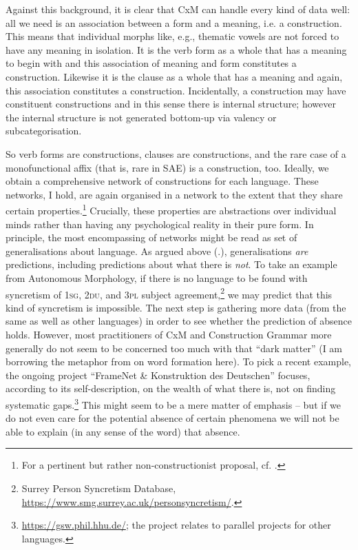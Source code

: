 \documentclass[output=paper]{langsci/langscibook}
\begin{document}
Against this background, it is clear that CxM can handle every kind of data well: all we need is an association between a form and a meaning, i.e. a construction. This means that individual morphs like, e.g., thematic vowels are not forced to have any meaning in isolation. It is the verb form as a whole that has a meaning to begin with and this association of meaning and form constitutes a construction. Likewise it is the clause as a whole that has a meaning and again, this association constitutes a construction. Incidentally, a construction may have constituent constructions and in this sense there is internal structure; however the internal structure is not generated bottom-up via valency or subcategorisation.

So verb forms are constructions, clauses are constructions, and the rare case of a monofunctional affix (that is, rare in SAE) is a construction, too. Ideally, we obtain a comprehensive network of constructions for each language. These networks, I hold, are again organised in a network to the extent that they share certain properties.\footnote{For a pertinent but rather non-constructionist proposal, cf. \citealt{ReinerInPress}.} Crucially, these properties are abstractions over individual minds rather than having any psychological reality in their pure form. In principle, the most encompassing of networks might be read as set of generalisations about language. As argued above (.), generalisations \textit{are} predictions, including predictions about what there is \textit{not}. To take an example from Autonomous Morphology, if there is no language to be found with syncretism of 1\textsc{sg}, 2\textsc{du}, and 3\textsc{pl} subject agreement,\footnote{Surrey Person Syncretism Database, \url{https://www.smg.surrey.ac.uk/personsyncretism/}.} we may predict that this kind of syncretism is impossible. The next step is gathering more data (from the same as well as other languages) in order to see whether the prediction of absence holds. However, most practitioners of CxM and Construction Grammar more generally do not seem to be concerned too much with that “dark matter” (I am borrowing the metaphor from \citealt{Werner2018} on word formation here). To pick a recent example, the ongoing project “FrameNet \& Konstruktion des Deutschen” focuses, according to its self-description, on the wealth of what there is, not on finding systematic gaps.\footnote{\url{https://gsw.phil.hhu.de/}{;} the project relates to parallel projects for other languages.} This might seem to be a mere matter of emphasis – but if we do not even care for the potential absence of certain phenomena we will not be able to explain (in any sense of the word) that absence.
\end{document}
